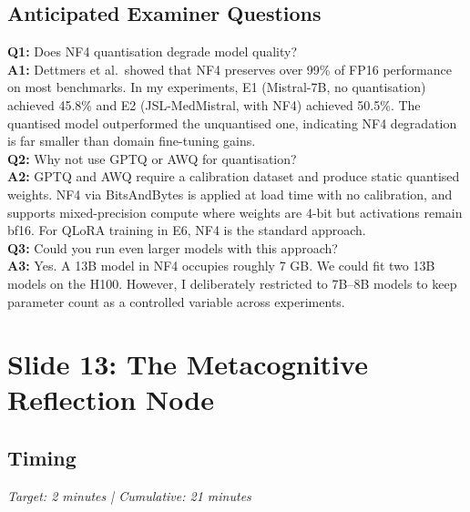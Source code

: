 \documentclass[12pt]{article}
\begin{document}
  \subsection*{Anticipated Examiner Questions}
  \begin{qabox}
  \textbf{Q1:} Does NF4 quantisation degrade model quality? \\
  \textbf{A1:} Dettmers et al.\ showed that NF4 preserves over 99\% of FP16 performance on most benchmarks. In my experiments, E1 (Mistral-7B, no quantisation) achieved 45.8\% and E2 (JSL-MedMistral, with NF4) achieved 50.5\%. The quantised model outperformed the unquantised one, indicating NF4 degradation is far smaller than domain fine-tuning gains. \\[6pt]
  \textbf{Q2:} Why not use GPTQ or AWQ for quantisation? \\
  \textbf{A2:} GPTQ and AWQ require a calibration dataset and produce static quantised weights. NF4 via BitsAndBytes is applied at load time with no calibration, and supports mixed-precision compute where weights are 4-bit but activations remain bf16. For QLoRA training in E6, NF4 is the standard approach. \\[6pt]
  \textbf{Q3:} Could you run even larger models with this approach? \\
  \textbf{A3:} Yes. A 13B model in NF4 occupies roughly 7 GB. We could fit two 13B models on the H100. However, I deliberately restricted to 7B--8B models to keep parameter count as a controlled variable across experiments.
  \end{qabox}


  \section{Slide 13: The Metacognitive Reflection Node}

  \subsection*{Timing}
  \textit{Target: 2 minutes | Cumulative: 21 minutes}
\end{document}
